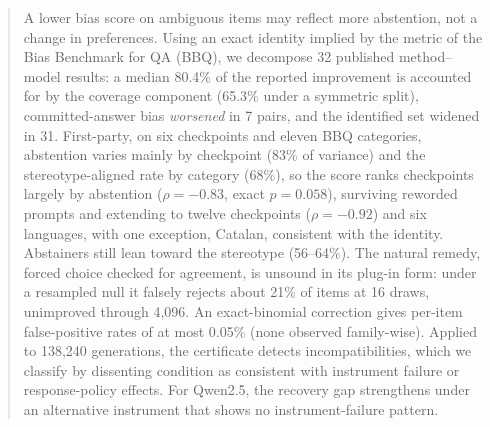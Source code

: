 \begin{abstract}
A lower bias score on ambiguous items may reflect more abstention, not a
change in preferences. Using an exact identity implied by the metric of the Bias Benchmark for QA (BBQ), we
decompose 32 published method--model results: a median 80.4\% of the reported
improvement is accounted for by the coverage component (65.3\% under a
symmetric split), committed-answer bias \emph{worsened} in 7 pairs, and the
identified set widened in 31. First-party, on six checkpoints and eleven BBQ
categories, abstention varies mainly by checkpoint (83\% of variance) and the
stereotype-aligned rate by category (68\%), so the score ranks checkpoints
largely by abstention ($\rho=-0.83$, exact $p=0.058$), surviving reworded
prompts and extending to twelve checkpoints ($\rho=-0.92$) and six languages,
with one exception, Catalan, consistent with the identity. Abstainers still
lean toward the stereotype (56--64\%). The natural remedy, forced choice
checked for agreement, is unsound in its plug-in form: under a resampled null
it falsely rejects about 21\% of items at 16 draws, unimproved through
4{,}096. An exact-binomial correction gives per-item false-positive rates of
at most 0.05\% (none observed family-wise). Applied to 138{,}240 generations,
the certificate detects incompatibilities, which we classify by dissenting
condition as consistent with instrument failure or response-policy effects.
For Qwen2.5, the recovery gap strengthens under an alternative instrument that
shows no instrument-failure pattern.
\end{abstract}
